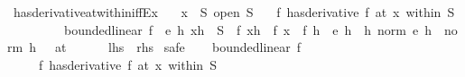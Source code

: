 \begin{isabellebody}
%
\endisadelimproof
\isanewline
{}\isamarkupfalse%
\ has{\isacharunderscore}{\kern0pt}derivative{\isacharunderscore}{\kern0pt}at{\isacharunderscore}{\kern0pt}within{\isacharunderscore}{\kern0pt}iff{\isacharunderscore}{\kern0pt}Ex{\isacharcolon}{\kern0pt}\isanewline
\ \ \ {\isachardoublequoteopen}x\ {\isasymin}\ S{\isachardoublequoteclose}\ {\isachardoublequoteopen}open\ S{\isachardoublequoteclose}\isanewline
\ \ \ {\isachardoublequoteopen}{\isacharparenleft}{\kern0pt}f\ has{\isacharunderscore}{\kern0pt}derivative\ f{\isacharprime}{\kern0pt}{\isacharparenright}{\kern0pt}\ {\isacharparenleft}{\kern0pt}at\ x\ within\ S{\isacharparenright}{\kern0pt}\ {\isasymlongleftrightarrow}\isanewline
\ \ \ \ \ \ \ \ \ bounded{\isacharunderscore}{\kern0pt}linear\ f{\isacharprime}{\kern0pt}\ {\isasymand}\ {\isacharparenleft}{\kern0pt}{\isasymexists}e{\isachardot}{\kern0pt}\ {\isacharparenleft}{\kern0pt}{\isasymforall}h{\isachardot}{\kern0pt}\ x{\isacharplus}{\kern0pt}h\ {\isasymin}\ S\ {\isasymlongrightarrow}\ f\ {\isacharparenleft}{\kern0pt}x{\isacharplus}{\kern0pt}h{\isacharparenright}{\kern0pt}\ {\isacharequal}{\kern0pt}\ f\ x\ {\isacharplus}{\kern0pt}\ f{\isacharprime}{\kern0pt}\ h\ {\isacharplus}{\kern0pt}\ e\ h{\isacharparenright}{\kern0pt}\ {\isasymand}\ {\isacharparenleft}{\kern0pt}{\isacharparenleft}{\kern0pt}{\isasymlambda}h{\isachardot}{\kern0pt}\ norm\ {\isacharparenleft}{\kern0pt}e\ h{\isacharparenright}{\kern0pt}\ {\isacharslash}{\kern0pt}\ norm\ h{\isacharparenright}{\kern0pt}\ {\isasymlonglongrightarrow}\ {}{\isacharparenright}{\kern0pt}\ {\isacharparenleft}{\kern0pt}at\ {}{\isacharparenright}{\kern0pt}{\isacharparenright}{\kern0pt}{\isachardoublequoteclose}\isanewline
\ \ \ \ {\isacharparenleft}{\kern0pt}\ {\isachardoublequoteopen}{\isacharquery}{\kern0pt}lhs\ {\isacharequal}{\kern0pt}\ {\isacharquery}{\kern0pt}rhs{\isachardoublequoteclose}{\isacharparenright}{\kern0pt}\isanewline
%
\isadelimproof
%
\endisadelimproof
%
\isatagproof
{}\isamarkupfalse%
\ safe\isanewline
\ \ \isamarkupfalse%
\ {\isachardoublequoteopen}bounded{\isacharunderscore}{\kern0pt}linear\ f{\isacharprime}{\kern0pt}{\isachardoublequoteclose}\isanewline
\ \ \ \ \ {\isachardoublequoteopen}{\isacharparenleft}{\kern0pt}f\ has{\isacharunderscore}{\kern0pt}derivative\ f{\isacharprime}{\kern0pt}{\isacharparenright}{\kern0pt}\ {\isacharparenleft}{\kern0pt}at\ x\ within\ S{\isacharparenright}{\kern0pt}{\isachardoublequoteclose}\isanewline
\ \ \ \ \isamarkupfalse%

\end{isabellebody}
